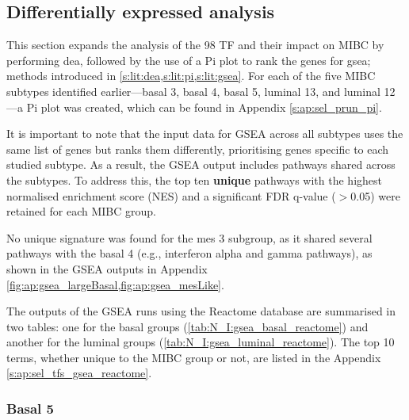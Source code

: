 \subsection{Differentially expressed analysis} \label{s:N_I:sel_tfs_subtypes}

This section expands the analysis of the 98 TF and their impact on MIBC by performing \acrlong{dea}, followed by the use of a Pi plot to rank the genes for \acrfull{gsea}; methods introduced in \cref{s:lit:dea,s:lit:pi,s:lit:gsea}. For each of the five MIBC subtypes identified earlier—basal 3, basal 4, basal 5, luminal 13, and luminal 12—a Pi plot was created, which can be found in Appendix \cref{s:ap:sel_prun_pi}. 

It is important to note that the input data for GSEA across all subtypes uses the same list of genes but ranks them differently, prioritising genes specific to each studied subtype. As a result, the GSEA output includes pathways shared across the subtypes. To address this, the top ten \textbf{unique} pathways with the highest normalised enrichment score (NES) and a significant FDR q-value ($>$0.05) were retained for each MIBC group.

No unique signature was found for the mes 3 subgroup, as it shared several pathways with the basal 4 (e.g., interferon alpha and gamma pathways), as shown in the GSEA outputs in Appendix \cref{fig:ap:gsea_largeBasal,fig:ap:gsea_mesLike}.

The outputs of the GSEA runs using the Reactome database are summarised in two tables: one for the basal groups (\cref{tab:N_I:gsea_basal_reactome}) and another for the luminal groups (\cref{tab:N_I:gsea_luminal_reactome}). The top 10 terms, whether unique to the MIBC group or not, are listed in the Appendix \cref{s:ap:sel_tfs_gsea_reactome}.


\subsubsection*{Basal 5}


